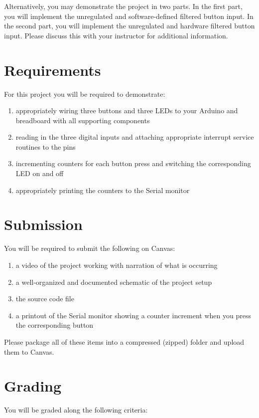 Alternatively, you may demonstrate the project in two parts. In the first part, you will implement the unregulated and software-defined filtered button input.
In the second part, you will implement the unregulated and hardware filtered button input.
Please discuss this with your instructor for additional information.

\section*{Requirements}
For this project you will be required to demonstrate:

\begin{enumerate}
    \item appropriately wiring three buttons and three LEDs to your Arduino and breadboard with all supporting components
    \item reading in the three digital inputs and attaching appropriate interrupt service routines to the pins
    \item incrementing counters for each button press and switching the corresponding LED on and off
    \item appropriately printing the counters to the Serial monitor
\end{enumerate}

\section*{Submission}
You will be required to submit the following on Canvas:
\begin{enumerate}
    \item a video of the project working with narration of what is occurring
    \item a well-organized and documented schematic of the project setup
    \item the source code file
    \item a printout of the Serial monitor showing a counter increment when you press the corresponding button
\end{enumerate}
Please package all of these items into a compressed (zipped) folder and upload them to Canvas.

\section*{Grading}
You will be graded along the following criteria:

